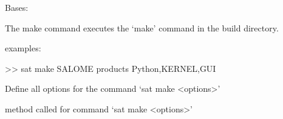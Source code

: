 \documentclass[a4paper,10pt,english]{sphinxmanual}
\begin{document}
\begin{fulllineitems}
\label{\detokenize{apidoc_commands/commands:commands.make.Command}}
Bases: 

The make command executes the ‘make’ command in the build directory.

\begin{DUlineblock}{0em}
\item[] examples:
\item[] \textgreater{}\textgreater{} sat make SALOME \textendash{}products Python,KERNEL,GUI
\end{DUlineblock}

\begin{fulllineitems}
\label{\detokenize{apidoc_commands/commands:commands.make.Command.getParser}}
Define all options for the command ‘sat make \textless{}options\textgreater{}’

\end{fulllineitems}


\begin{fulllineitems}
\label{\detokenize{apidoc_commands/commands:commands.make.Command.name}}
\end{fulllineitems}


\begin{fulllineitems}
\label{\detokenize{apidoc_commands/commands:commands.make.Command.run}}
method called for command ‘sat make \textless{}options\textgreater{}’

\end{fulllineitems}


\end{fulllineitems}


\begin{fulllineitems}
\label{\detokenize{apidoc_commands/commands:commands.make.get_nb_proc}}
\end{fulllineitems}
\end{document}

